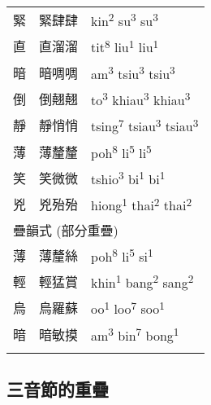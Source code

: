 \begin{tabularx}{\textwidth}{XXX}
 緊 & 緊肆肆 & {\sffamily \textrm{kin}\textrm{\textsuperscript{2}} \textrm{su}\textrm{\textsuperscript{3}} \textrm{su}\textrm{\textsuperscript{3}}}\\
 直 & 直溜溜 & {\sffamily \textrm{tit}\textrm{\textsuperscript{8}} \textrm{liu}\textrm{\textsuperscript{1}} \textrm{liu}\textrm{\textsuperscript{1}}}\\
 暗 & 暗啁啁 & {\sffamily \textrm{am}\textrm{\textsuperscript{3}} \textrm{tsiu}\textrm{\textsuperscript{3}} \textrm{tsiu}\textrm{\textsuperscript{3}}}\\
 倒 & 倒翹翹 & {\sffamily \textrm{to}\textrm{\textsuperscript{3}} \textrm{khiau}\textrm{\textsuperscript{3}} \textrm{khiau}\textrm{\textsuperscript{3}}}\\
 靜 & 靜悄悄 & {\sffamily \textrm{tsing}\textrm{\textsuperscript{7}} \textrm{tsiau}\textrm{\textsuperscript{3}} \textrm{tsiau}\textrm{\textsuperscript{3}}}\\
 薄 & 薄釐釐 & {\sffamily \textrm{poh}\textrm{\textsuperscript{8}} \textrm{li}\textrm{\textsuperscript{5}} \textrm{li}\textrm{\textsuperscript{5}}}\\
 笑 & 笑微微 & {\sffamily \textrm{tshio}\textrm{\textsuperscript{3}} \textrm{bi}\textrm{\textsuperscript{1}} \textrm{bi}\textrm{\textsuperscript{1}}}\\
 兇 & 兇殆殆 & {\sffamily \textrm{hiong}\textrm{\textsuperscript{1}} \textrm{thai}\textrm{\textsuperscript{2}} \textrm{thai}\textrm{\textsuperscript{2}}}\\
\multicolumn{3}{X}{ 疊韻式 (部分重疊)}\\
 薄 & 薄釐絲 & {\sffamily \textrm{poh}\textrm{\textsuperscript{8}} \textrm{li}\textrm{\textsuperscript{5}} \textrm{si}\textrm{\textsuperscript{1}}}\\
 輕 & 輕猛賞 & {\sffamily \textrm{khin}\textrm{\textsuperscript{1}} \textrm{bang}\textrm{\textsuperscript{2}} \textrm{sang}\textrm{\textsuperscript{2}}}\\
 烏 & 烏羅蘇 & {\sffamily \textrm{oo}\textrm{\textsuperscript{1}} \textrm{loo}\textrm{\textsuperscript{7}} \textrm{soo}\textrm{\textsuperscript{1}}}\\
 暗 & 暗敏摸 & {\sffamily \textrm{am}\textrm{\textsuperscript{3} }\textrm{bin}\textrm{\textsuperscript{7}} \textrm{bong}\textrm{\textsuperscript{1}}}\\
\lspbottomrule
\end{tabularx}
\subsection{\rmfamily 三音節的重疊}

